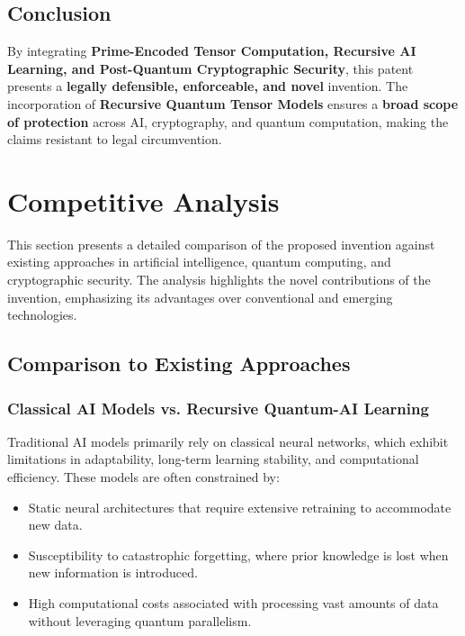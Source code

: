 \documentclass{article}
\theoremstyle{plain}
\begin{document}
\subsection{Conclusion}

By integrating \textbf{Prime-Encoded Tensor Computation, Recursive AI Learning, and Post-Quantum Cryptographic Security}, this patent presents a \textbf{legally defensible, enforceable, and novel} invention. The incorporation of \textbf{Recursive Quantum Tensor Models} ensures a \textbf{broad scope of protection} across AI, cryptography, and quantum computation, making the claims resistant to legal circumvention.


\section{Competitive Analysis}

This section presents a detailed comparison of the proposed invention against existing approaches in artificial intelligence, quantum computing, and cryptographic security. The analysis highlights the novel contributions of the invention, emphasizing its advantages over conventional and emerging technologies.

\subsection{Comparison to Existing Approaches}

\subsubsection{Classical AI Models vs. Recursive Quantum-AI Learning}

Traditional AI models primarily rely on classical neural networks, which exhibit limitations in adaptability, long-term learning stability, and computational efficiency. These models are often constrained by:
\begin{itemize}
    \item Static neural architectures that require extensive retraining to accommodate new data.
    \item Susceptibility to catastrophic forgetting, where prior knowledge is lost when new information is introduced.
    \item High computational costs associated with processing vast amounts of data without leveraging quantum parallelism.
\end{itemize}
\end{document}
